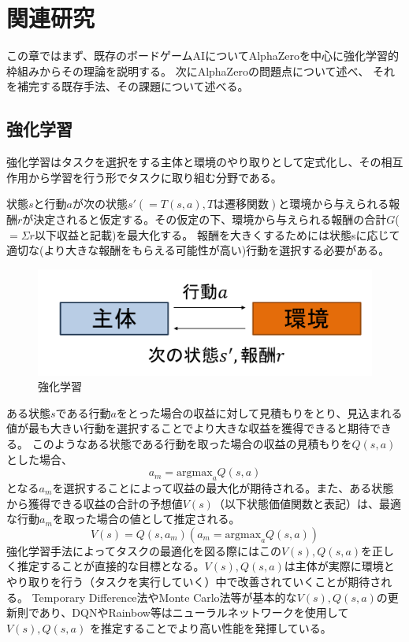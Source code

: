 \chapter{関連研究}
この章ではまず、既存のボードゲームAIについてAlphaZeroを中心に強化学習的枠組みからその理論を説明する。
次にAlphaZeroの問題点について述べ、
それを補完する既存手法、その課題について述べる。



\section{強化学習\cite{RL}}
強化学習はタスクを選択をする主体と環境のやり取りとして定式化し、その相互作用から学習を行う形でタスクに取り組む分野である。


状態$s$と行動$a$が次の状態${s'}(=T(s, a), Tは遷移関数)$と環境から与えられる報酬$r$が決定されると仮定する。その仮定の下、環境から与えられる報酬の合計$G$($=\Sigma r$以下収益と記載)を最大化する。
報酬を大きくするためには状態sに応じて適切な(より大きな報酬をもらえる可能性が高い)行動を選択する必要がある。
\begin{figure}[t]
	\centering
	\includegraphics[width=\linewidth]{./figure/RL.png}
	\caption{強化学習}
	\label{fig:RL}
\end{figure}
ある状態$s$である行動$a$をとった場合の収益に対して見積もりをとり、見込まれる値が最も大きい行動を選択することでより大きな収益を獲得できると期待できる。
このようなある状態である行動を取った場合の収益の見積もりを$Q(s, a)$とした場合、
\begin{equation}
	{\displaystyle a_m = {\textrm{argmax}}_{a} Q(s, a)}
\end{equation}
となる$a_m$を選択することによって収益の最大化が期待される。また、ある状態から獲得できる収益の合計の予想値$V(s)$（以下状態価値関数と表記）は、最適な行動$a_m$を取った場合の値として推定される。
\begin{equation}
	{\displaystyle V(s) = Q(s, a_m)(a_m = \textrm{argmax}_{a} Q(s, a))}
\end{equation}
強化学習手法によってタスクの最適化を図る際にはこの$V(s),Q(s, a)$を正しく推定することが直接的な目標となる。$V(s),Q(s, a)$は主体が実際に環境とやり取りを行う（タスクを実行していく）中で改善されていくことが期待される。
Temporary Difference法やMonte Carlo法等が基本的な$V(s),Q(s, a)$の更新則であり、DQN\cite{DQN}やRainbow\cite{rainbow}等はニューラルネットワークを使用して$V(s),Q(s, a)$
を推定することでより高い性能を発揮している。



